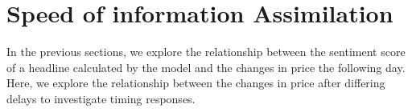 



\section{Speed of information Assimilation}

In the previous sections, we explore the relationship between the sentiment score of a headline calculated by the model and the changes in price the following day. Here, we explore the relationship between the changes in price after differing delays to investigate timing responses.

